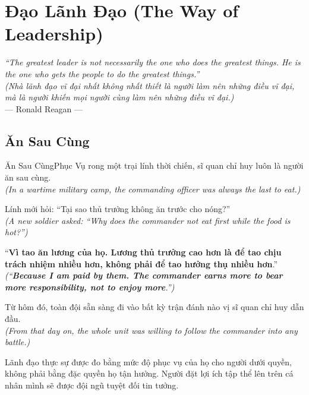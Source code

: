 \chapter{Đạo Lãnh Đạo (The Way of Leadership)}

\begin{center}
  \textit{\color{truyenblue}``The greatest leader is not necessarily the one who does the greatest things. He is the one who gets the people to do the greatest things.''}\\
  \textit{(Nhà lãnh đạo vĩ đại nhất không nhất thiết là người làm nên những điều vĩ đại, mà là người khiến mọi người cùng làm nên những điều vĩ đại.)}\\[4pt]
  \small\color{truyengold}--- Ronald Reagan ---
\end{center}
\ngancach

\section{Ăn Sau Cùng}
\begin{truyen}{Ăn Sau Cùng}{Phục Vụ}
rong một trại lính thời chiến, sĩ quan chỉ huy luôn là người ăn sau cùng.\\
\textit{(In a wartime military camp, the commanding officer was always the last to eat.)}

Lính mới hỏi: ``Tại sao thủ trưởng không ăn trước cho nóng?''\\
\textit{(A new soldier asked: ``Why does the commander not eat first while the food is hot?'')}

``\textbf{Vì tao ăn lương của họ. Lương thủ trưởng cao hơn là để tao chịu trách nhiệm nhiều hơn, không phải để tao hưởng thụ nhiều hơn}.''\\
\textit{(``\textbf{Because I am paid by them. The commander earns more to bear more responsibility, not to enjoy more}.'')}

Từ hôm đó, toàn đội sẵn sàng đi vào bất kỳ trận đánh nào vị sĩ quan chỉ huy dẫn đầu.\\
\textit{(From that day on, the whole unit was willing to follow the commander into any battle.)}
\end{truyen}
\begin{baihoc}
  Lãnh đạo thực sự được đo bằng mức độ phục vụ của họ cho người dưới quyền, không phải bằng đặc quyền họ tận hưởng. Người đặt lợi ích tập thể lên trên cá nhân mình sẽ được đội ngũ tuyệt đối tin tưởng.
\end{baihoc}

